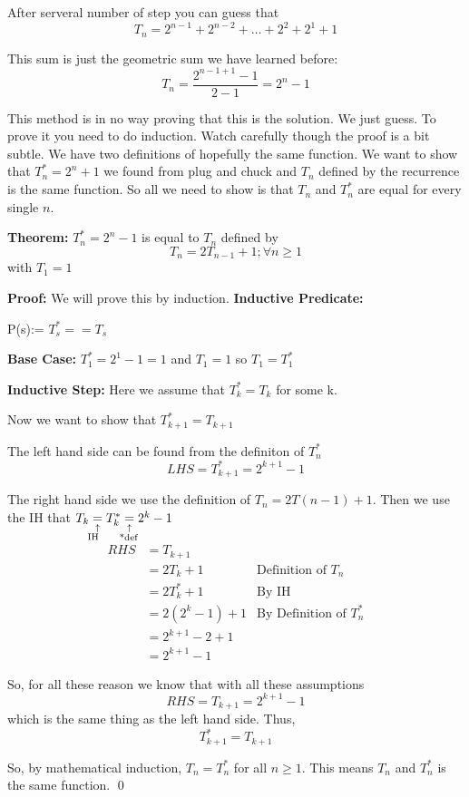 \documentclass[a4paper, 12pt]{article}
\newcommand{\theorem}{\vspace{1em}\noindent\textbf{Theorem:} }
\newcommand{\predicate}{\vspace{0.25em}\noindent\textbf{Inductive Predicate:} }
\newcommand{\inductivestep}{\vspace{0.25em}\noindent\textbf{Inductive Step:} }
\renewcommand{\proof}{\vspace{0.5em}\noindent\textbf{Proof:} }
\newcommand{\basecase}{\vspace{0.25em}\noindent\textbf{Base Case:} }
\newcommand{\qedd}{\qed\newline}
\newcommand{\expl}[2]{%
	\underset{\substack{\uparrow\\\mathrlap{\text{\hspace{-1em}#2}}}}{#1}}
\begin{document}
\begin{multicols}{2}
After serveral number of step you can guess that
\[
	T_n = 2^{n-1} + 2^{n-2} + \ldots + 2^2 + 2^1 + 1
\]

This sum is just the geometric sum we have learned before:
\[
	T_n = \frac{2^{n-1+1}-1}{2-1} = 2^n -1 
\]

This method is in no way proving that this is the solution. We just guess. To prove it you need to do induction. Watch carefully though the proof is a bit subtle. We have two definitions of hopefully the same function. We want to show that $T^*_n = 2^n + 1$ we found from plug and chuck and $T_n$ defined by the recurrence is the same function. So all we need to show is that $T_n$ and $T_n^*$ are equal for every single $n$.

\theorem $T_n^* = 2^n -1$ is equal to $T_n$ defined by $$T_n = 2T_{n-1} + 1; \forall n \ge 1$$ with $T_1=1$

\proof We will prove this by induction.
\predicate

	P(s):= $T_s^* == T_s$

\basecase $T_1^* = 2^1 -1 = 1$ and $T_1=1$ so $T_1 = T_1^*$ \checkmark

\inductivestep Here we assume that $T_k^* = T_k$ for some k.

Now we want to show that $T_{k+1}^* = T_{k+1}$

The left hand side can be found from the definiton of $T_n^*$
\[
	LHS = T_{k+1}^* = 2^{k+1} -1
\]

The right hand side we use the definition of $T_n = 2T(n-1) +1$. Then we use the IH that $T_{k} \expl{=}{IH} T_k^* \expl{=}{*def} 2^k - 1 $
\begin{align*}
	RHS &= T_{k+1}\\
	&= 2T_k + 1 & \text{Definition of $T_n$}\\
	&= 2T^*_k +1 & \text{By IH}\\
	&= 2\left(2^k - 1\right)+1 & \text{By Definition of $T^*_n$}\\
	&=2^{k+1} -2 +1\\
	&= 2^{k+1} - 1
\end{align*}

So, for all these reason we know that with all these assumptions
\[
	RHS = T_{k+1} = 2^{k+1} -1
\]
which is the same thing as the left hand side. Thus,
\[
	T_{k+1}^* = T_{k+1}
\]

So, by mathematical induction, $T_n = T_n^*$ for all $n \ge 1$. This means $T_n$ and $T_n^*$ is the same function.
\qedd


\end{multicols}
\end{document}
